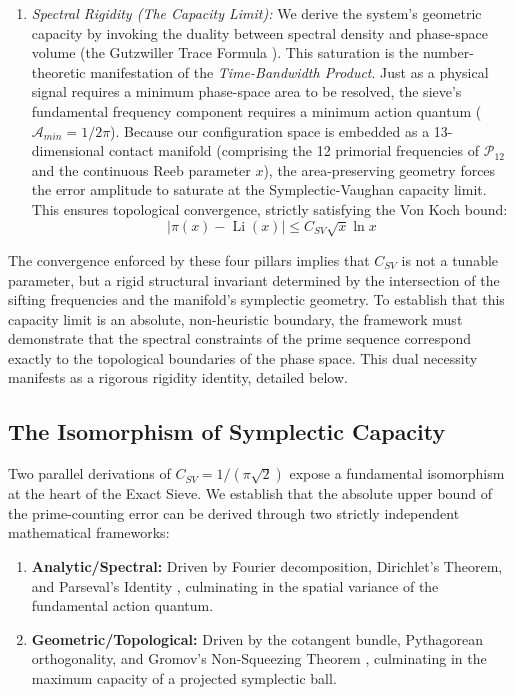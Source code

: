 \documentclass[sn-mathphys-num, pdflatex]{sn-jnl}
\begin{document}
\begin{enumerate}
    \item \textit{Spectral Rigidity (The Capacity Limit):} We derive the system's geometric capacity by invoking the duality between spectral density and phase-space volume (the Gutzwiller Trace Formula \cite{gutzwiller}). This saturation is the number-theoretic manifestation of the \textit{Time-Bandwidth Product}. Just as a physical signal requires a minimum phase-space area to be resolved, the sieve's fundamental frequency component requires a minimum action quantum ($\mathcal{A}_{min} = 1/2\pi$). Because our configuration space is embedded as a 13-dimensional contact manifold (comprising the 12 primorial frequencies of $\mathcal{P}_{12}$ and the continuous Reeb parameter $x$), the area-preserving geometry forces the error amplitude to saturate at the Symplectic-Vaughan capacity limit. This ensures topological convergence, strictly satisfying the Von Koch bound:
    \begin{equation}
    |\pi(x) - \operatorname{Li}(x)| \le C_{SV} \sqrt{x} \ln x
    \end{equation}
\end{enumerate}
The convergence enforced by these four pillars implies that $C_{SV}$ is not a tunable parameter, but a rigid structural invariant determined by the intersection of the sifting frequencies and the manifold's symplectic geometry. To establish that this capacity limit is an absolute, non-heuristic boundary, the framework must demonstrate that the spectral constraints of the prime sequence correspond exactly to the topological boundaries of the phase space. This dual necessity manifests as a rigorous rigidity identity, detailed below.
\subsection{The Isomorphism of Symplectic Capacity}

Two parallel derivations of $C_{SV} = 1/(\pi\sqrt{2})$ expose a fundamental isomorphism at the heart of the Exact Sieve. We establish that the absolute upper bound of the prime-counting error can be derived through two strictly independent mathematical frameworks:

\begin{enumerate}
    \item \textbf{Analytic/Spectral:} Driven by Fourier decomposition, Dirichlet's Theorem, and Parseval's Identity \cite{stein2003fourier}, culminating in the spatial variance of the fundamental action quantum.
    \item \textbf{Geometric/Topological:} Driven by the cotangent bundle, Pythagorean orthogonality, and Gromov's Non-Squeezing Theorem \cite{mcduff2017introduction}, culminating in the maximum capacity of a projected symplectic ball.
\end{enumerate}
\end{document}
